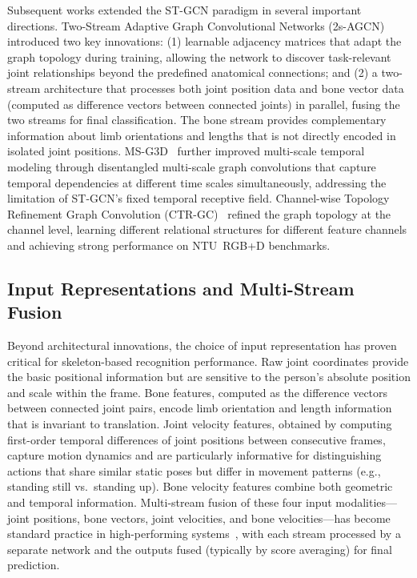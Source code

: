 Subsequent works extended the ST-GCN paradigm in several important directions. Two-Stream Adaptive Graph Convolutional Networks (2s-AGCN)~\cite{shi2019two} introduced two key innovations: (1) learnable adjacency matrices that adapt the graph topology during training, allowing the network to discover task-relevant joint relationships beyond the predefined anatomical connections; and (2) a two-stream architecture that processes both joint position data and bone vector data (computed as difference vectors between connected joints) in parallel, fusing the two streams for final classification. The bone stream provides complementary information about limb orientations and lengths that is not directly encoded in isolated joint positions. MS-G3D~\cite{liu2020msg3d} further improved multi-scale temporal modeling through disentangled multi-scale graph convolutions that capture temporal dependencies at different time scales simultaneously, addressing the limitation of ST-GCN's fixed temporal receptive field. Channel-wise Topology Refinement Graph Convolution (CTR-GC)~\cite{chen2021channel} refined the graph topology at the channel level, learning different relational structures for different feature channels and achieving strong performance on NTU~RGB+D benchmarks.

\subsection*{Input Representations and Multi-Stream Fusion}

Beyond architectural innovations, the choice of input representation has proven critical for skeleton-based recognition performance. Raw joint coordinates provide the basic positional information but are sensitive to the person's absolute position and scale within the frame. Bone features, computed as the difference vectors between connected joint pairs, encode limb orientation and length information that is invariant to translation. Joint velocity features, obtained by computing first-order temporal differences of joint positions between consecutive frames, capture motion dynamics and are particularly informative for distinguishing actions that share similar static poses but differ in movement patterns (e.g., standing still vs.\ standing up). Bone velocity features combine both geometric and temporal information. Multi-stream fusion of these four input modalities---joint positions, bone vectors, joint velocities, and bone velocities---has become standard practice in high-performing systems~\cite{shi2019two, chen2021channel}, with each stream processed by a separate network and the outputs fused (typically by score averaging) for final prediction.

